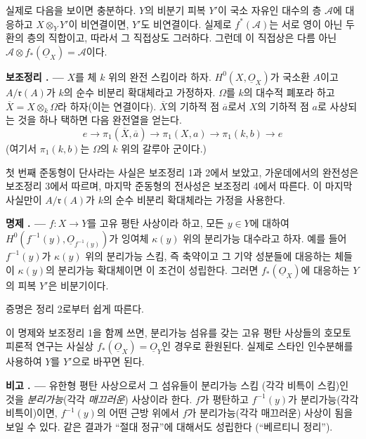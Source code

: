 \documentclass[11pt,twoside,openany]{book}
\numberwithin{equation}{section}
\newcommand{\sourceunit}{front}
\newcommand{\src}[1]{%
  \phantomsection\hypertarget{src:\sourceunit:#1}{}%
  \marginpar{\raggedleft\footnotesize\sffamily #1}%
}
\newcommand{\Osh}{\underline{O}}
\theoremstyle{plain}
\theoremstyle{definition}
\theoremstyle{remark}
\newcommand{\result}[2]{%
  \par\medskip\noindent\textbf{#1%
  \if\relax\detokenize{#2}\relax\else\space#2\fi. ---}\enspace
}
\begin{document}
실제로 다음을 보이면 충분하다. $Y$의 비분기 피복 $Y'$이 국소 자유인
대수의 층 $\mathcal A$에 대응하고 $X\otimes_Y Y'$이 비연결이면,
$Y'$도 비연결이다. 실제로 $f^*(\mathcal A)$는 서로 영이 아닌 두 환의
층의 직합이고, 따라서 그 직접상도 그러하다. 그런데 이 직접상은 다름
아닌
$\mathcal A\otimes f_*(\Osh_X)=\mathcal A$이다.

\result{보조정리}{5} $X$를 체 $k$ 위의 완전 스킴이라 하자.
$H^0(X,\Osh_X)$가 국소환 $A$이고 $A/\mathfrak r(A)$가 $k$의 순수
비분리 확대체라고 가정하자. $\Omega$를 $k$의 대수적 폐포라 하고
$\overline X=X\otimes_k\Omega$라 하자(이는 연결이다). $\overline X$의
기하적 점 $\overline a$로서 $X$의 기하적 점 $a$로 사상되는 것을 하나
택하면 다음 완전열을 얻는다.
\[
  e\longrightarrow\pi_1(\overline X,\overline a)
  \longrightarrow\pi_1(X,a)
  \longrightarrow\pi_1(k,b)\longrightarrow e
\]
(여기서 $\pi_1(k,b)$는 $\Omega$의 $k$ 위의 갈루아 군이다.)

첫 번째 준동형이 단사라는 사실은 보조정리 1과 2에서 보았고, 가운데에서의
완전성은 보조정리 3에서 따르며, 마지막 준동형의 전사성은 보조정리 4에서
따른다. 이 마지막 사실만이 $A/\mathfrak r(A)$가 $k$의 순수 비분리
확대체라는 가정을 사용한다.

\result{명제}{4} $f:X\longrightarrow Y$를 고유 평탄 사상이라 하고,
모든 $y\in Y$에 대하여
$H^0(f^{-1}(y),\Osh_{f^{-1}(y)})$가 잉여체 $\kappa(y)$ 위의 분리가능
대수라고 하자. 예를 들어 $f^{-1}(y)$가 $\kappa(y)$ 위의 분리가능
스킴, 즉 축약이고 그 기약 성분들에 대응하는 체들이 $\kappa(y)$의
분리가능 확대체이면 이 조건이 성립한다. 그러면 $f_*(\Osh_X)$에
대응하는 $Y$의 피복 $Y'$은 비분기이다.

증명은 정리 2로부터 쉽게 따른다.

\src{213}
이 명제와 보조정리 1을 함께 쓰면, 분리가능 섬유를 갖는 고유 평탄
사상들의 호모토피론적 연구는 사실상 $f_*(\Osh_X)=\Osh_Y$인 경우로
환원된다. 실제로 스타인 인수분해를 사용하여 $Y$를 $Y'$으로 바꾸면 된다.

\result{비고}{} 유한형 평탄 사상으로서 그 섬유들이 분리가능 스킴
(각각 비특이 스킴)인 것을 \emph{분리가능}(각각 \emph{매끄러운})
사상이라 한다. $f$가 평탄하고 $f^{-1}(y)$가 분리가능(각각 비특이)이면,
$f^{-1}(y)$의 어떤 근방 위에서 $f$가 분리가능(각각 매끄러운) 사상이
됨을 보일 수 있다. 같은 결과가 “절대 정규”에 대해서도 성립한다
(“베르티니 정리”).
\end{document}
